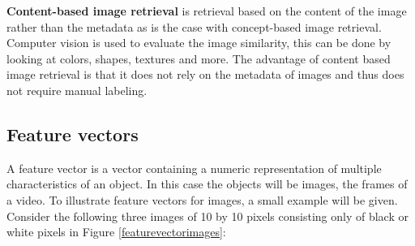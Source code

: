 \documentclass{article}
\begin{document}
\textbf{Content-based image retrieval} is retrieval based on the content of the image rather than the metadata as is the case with concept-based image retrieval. Computer vision is used to evaluate the image similarity, this can be done by looking at colors, shapes, textures and more. The advantage of content based image retrieval is that it does not rely on the metadata of images and thus does not require manual labeling.

\subsection{Feature vectors}
A feature vector is a vector containing a numeric representation of multiple characteristics of an object. In this case the objects will be images, the frames of a video. To illustrate feature vectors for images, a small example will be given. Consider the following three images of 10 by 10 pixels consisting only of black or white pixels in Figure \ref{featurevectorimages}: 
\end{document}
